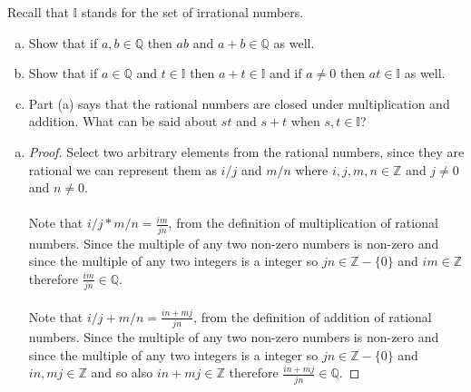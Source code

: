\documentclass[12pt]{article}
\makeatletter
\theoremstyle{homework}
\newenvironment{exercise}[1]
{\def\@currentlabel{#1}\exercisecore}
{\endexercisecore}
\newcommand{\Rats}{\ensuremath{\mathbb Q}}
\makeatother
\begin{document}
\begin{exercise}{1.4.1}
Recall that $\mathbb{I}$ stands for the set of irrational numbers.
\begin{enumerate}[(a)]
\item Show that if $a,b\in\Rats$ then $ab$ and $a+b\in\Rats$ as well.
\item Show that if $a\in\Rats$ and $t\in\mathbb{I}$ then $a+t\in\mathbb{I}$ and if $a\neq 0$ then $at\in\mathbb{I}$ as well.
\item Part (a) says that the rational numbers are closed under multiplication
and addition.  What can be said about $st$ and $s+t$ when $s,t\in\mathbb{I}$?
\end{enumerate}
\end{exercise}
\begin{enumerate}[(a)]
\item \begin{proof}
Select two arbitrary elements from the rational numbers, since they are rational we can represent them as $i/j$ and $m/n$ where $i,j,m,n\in \mathbb{Z}$ and $j\neq 0$ and $n\neq 0$.\\\\
Note that $i/j*m/n=\frac{im}{jn}$, from the definition of multiplication of rational numbers.  Since the multiple of any two non-zero numbers is non-zero and since the multiple of any two integers is a integer so $jn\in \mathbb{Z}-\{0\}$ and $im\in \mathbb{Z}$ therefore $\frac{im}{jn}\in \mathbb{Q}$.\\\\
Note that $i/j+m/n=\frac{in+mj}{jn}$, from the definition of addition of rational numbers.  Since the multiple of any two non-zero numbers is non-zero and since the multiple of any two integers is a integer so $jn\in \mathbb{Z}-\{0\}$ and $in,mj\in \mathbb{Z}$ and so also $in+mj \in \mathbb{Z}$ therefore $\frac{in+mj}{jn}\in \mathbb{Q}$.
\end{proof}


\end{enumerate}
\end{document}
